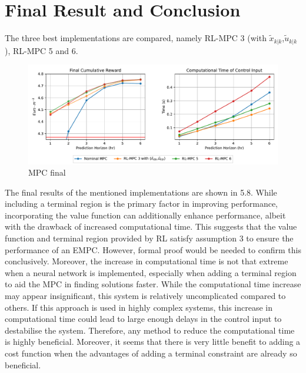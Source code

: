 \section{Final Result and Conclusion} \label{section:final-rl-mpc-nominal}
The three best implementations are compared, namely RL-MPC 3 (with $\tilde{x}_{k|k}$,$\tilde{u}_{k|k}$), RL-MPC 5 and 6.
\begin{figure}[H]
	\centering
	\includegraphics[width=\textwidth]{figures/rl_mpc_impl_final.pdf}
	\caption{MPC final }
	\label{fig:rlmpc-final}
\end{figure}

The final results of the mentioned implementations are shown in 5.8. While including a terminal region is the primary factor in improving performance, incorporating the value function can additionally enhance performance, albeit with the drawback of increased computational time. This suggests that the value function and terminal region provided by RL satisfy assumption 3 to ensure the performance of an EMPC. However, formal proof would be needed to confirm this conclusively. Moreover, the increase in computational time is not that extreme when a neural network is implemented, especially when adding a terminal region to aid the MPC in finding solutions faster. While the computational time increase may appear insignificant, this system is relatively uncomplicated compared to others. If this approach is used in highly complex systems, this increase in computational time could lead to large enough delays in the control input to destabilise the system. Therefore, any method to reduce the computational time is highly beneficial. Moreover, it seems that there is very little benefit to adding a cost function when the advantages of adding a terminal constraint are already so beneficial.



